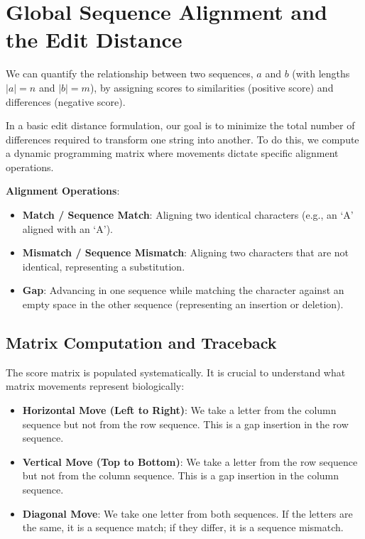 \section{Global Sequence Alignment and the Edit Distance}

We can quantify the relationship between two sequences, $a$ and $b$ (with lengths $|a| = n$ and $|b| = m$), by assigning scores to similarities (positive score) and differences (negative score). 

In a basic edit distance formulation, our goal is to minimize the total number of differences required to transform one string into another. To do this, we compute a dynamic programming matrix where movements dictate specific alignment operations.

\begin{important}
    \textbf{Alignment Operations}:
    \begin{itemize}
        \item \textbf{Match / Sequence Match}: Aligning two identical characters (e.g., an `A' aligned with an `A').
        \item \textbf{Mismatch / Sequence Mismatch}: Aligning two characters that are not identical, representing a substitution.
        \item \textbf{Gap}: Advancing in one sequence while matching the character against an empty space in the other sequence (representing an insertion or deletion).
    \end{itemize}
\end{important}

\subsection{Matrix Computation and Traceback}

The score matrix is populated systematically. \sta It is crucial to understand what matrix movements represent biologically:
\begin{itemize}
    \item \textbf{Horizontal Move (Left to Right)}: We take a letter from the column sequence but not from the row sequence. This is a gap insertion in the row sequence.
    \item \textbf{Vertical Move (Top to Bottom)}: We take a letter from the row sequence but not from the column sequence. This is a gap insertion in the column sequence.
    \item \textbf{Diagonal Move}: We take one letter from both sequences. If the letters are the same, it is a sequence match; if they differ, it is a sequence mismatch.
\end{itemize}

